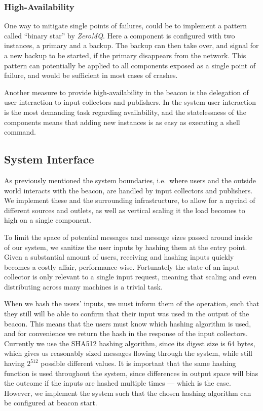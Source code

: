 \subsubsection{High-Availability}
One way to mitigate single points of failures, could be to implement a pattern called \enquote{binary star} by \textit{ZeroMQ}.
Here a component is configured with two instances, a primary and a backup.
The backup can then take over, and signal for a new backup to be started, if the primary disappears from the network.
This pattern can potentially be applied to all components exposed as a single point of failure, and would be sufficient in most cases of crashes.

Another measure to provide high-availability in the beacon is the delegation of user interaction to input collectors and publishers.
In the system user interaction is the most demanding task regarding availability, and the statelessness of the components means that adding new instances is as easy as executing a shell command.

\subsection{System Interface}%
\label{sub:system_interface}
As previously mentioned the system boundaries, i.e.\ where users and the outside world interacts with the beacon, are handled by input collectors and publishers.
We implement these and the surrounding infrastructure, to allow for a myriad of different sources and outlets, as well as vertical scaling it the load becomes to high on a single component.

To limit the space of potential messages and message sizes passed around inside of our system, we sanitize the user inputs by hashing them at the entry point.
Given a substantial amount of users, receiving and hashing inputs quickly becomes a costly affair, performance-wise.
Fortunately the state of an input collector is only relevant to a single input request, meaning that scaling and even distributing across many machines is a trivial task.

When we hash the users' inputs, we must inform them of the operation, such that they still will be able to confirm that their input was used in the output of the beacon.
This means that the users must know which hashing algorithm is used, and for convenience we return the hash in the response of the input collectors.
Currently we use the SHA512 hashing algorithm, since its digest size is 64 bytes, which gives us reasonably sized messages flowing through the system, while still having $2^{512}$ possible different values.
It is important that the same hashing function is used throughout the system, since differences in output space will bias the outcome if the inputs are hashed multiple times --- which is the case.
However, we implement the system such that the chosen hashing algorithm can be configured at beacon start.

